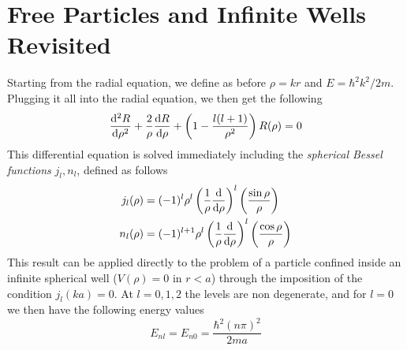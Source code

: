 \documentclass[../qm.tex]{subfiles}
\begin{document}
	\section{Free Particles and Infinite Wells Revisited}
	Starting from the radial equation, we define as before $\rho=kr$ and $E=\hbar^2k^2/2m$. Plugging it all into the radial equation, we then get the following
	\begin{equation}
		\derivative[2]{R}{\rho}+\frac{2}{\rho}\derivative{R}{\rho}+\left( 1-\frac{l(l+1)}{\rho^2} \right)R(\rho)=0
		\label{eq:freeparticle3d}
	\end{equation}
	This differential equation is solved immediately including the \textit{spherical Bessel functions} $j_l,n_l$, defined as follows
	\begin{equation}
		\begin{aligned}
			j_l(\rho)&=(-1)^l\rho^l\left( \frac{1}{\rho}\derivative{\rho} \right)^l\left( \frac{\sin\rho}{\rho} \right)\\
			n_l(\rho)&=(-1)^{l+1}\rho^l\left( \frac{1}{\rho}\derivative{\rho} \right)^l\left( \frac{\cos\rho}{\rho} \right)
		\end{aligned}
		\label{eq:besselsphericalfunctionsfreep}
	\end{equation}
	This result can be applied directly to the problem of a particle confined inside an infinite spherical well ($V(\rho)=0$ in $r<a$) through the imposition of the condition $j_l(ka)=0$. At $l=0,1,2$ the levels are non degenerate, and for $l=0$ we then have the following energy values
	\begin{equation}
		E_{nl}=E_{n0}=\frac{\hbar^2(n\pi)^2}{2ma}
		\label{eq:enlsphinfwell}
	\end{equation}
\end{document}
